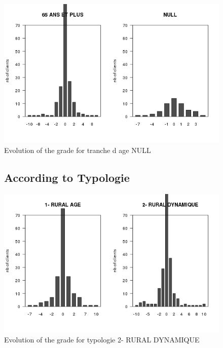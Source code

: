 \documentclass[a4paper, 11pt]{article}
\begin{document}
        \begin{figure}[!ht]
                \centering
                \includegraphics[height = 10 cm]{Remi/Evolution_of_the_grade_for_tranche_d_age_NULL.png}
                \caption{Evolution of the grade for tranche d age NULL}
                \label{fig:e_age_NULL}
        \end{figure}

        \begin{figure}[!ht]
				\subsection{According to Typologie}
                \centering
                \includegraphics[height = 10 cm]{Remi/Evolution_of_the_grade_for_typologie_2-RURAL-DYNAMIQUE.png}
                \caption{Evolution of the grade for typologie 2- RURAL DYNAMIQUE}
                \label{fig:e_typo2}
        \end{figure}
\end{document}
